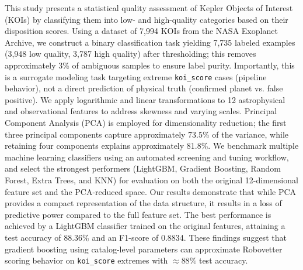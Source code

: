This study presents a statistical quality assessment of Kepler Objects of Interest (KOIs) by classifying them into low- and high-quality categories based on their disposition scores. Using a dataset of 7,994 KOIs from the NASA Exoplanet Archive, we construct a binary classification task yielding 7,735 labeled examples (3,948 low quality, 3,787 high quality) after thresholding; this removes approximately 3\% of ambiguous samples to ensure label purity. Importantly, this is a surrogate modeling task targeting extreme \texttt{koi\_score} cases (pipeline behavior), not a direct prediction of physical truth (confirmed planet vs. false positive). We apply logarithmic and linear transformations to 12 astrophysical and observational features to address skewness and varying scales. Principal Component Analysis (PCA) is employed for dimensionality reduction; the first three principal components capture approximately 73.5\% of the variance, while retaining four components explains approximately 81.8\%. We benchmark multiple machine learning classifiers using an automated screening and tuning workflow, and select the strongest performers (LightGBM, Gradient Boosting, Random Forest, Extra Trees, and KNN) for evaluation on both the original 12-dimensional feature set and the PCA-reduced space. Our results demonstrate that while PCA provides a compact representation of the data structure, it results in a loss of predictive power compared to the full feature set. The best performance is achieved by a LightGBM classifier trained on the original features, attaining a test accuracy of 88.36\% and an F1-score of 0.8834. These findings suggest that gradient boosting using catalog-level parameters can approximate Robovetter scoring behavior on \texttt{koi\_score} extremes with $\approx 88\%$ test accuracy.
